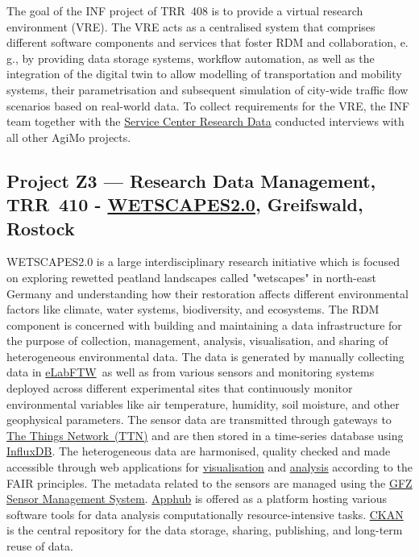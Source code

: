 \documentclass{eceasst}
\newcommand{\eg}{e.\,g.}
\newcommand{\elabftw}{\href{https://www.elabftw.net/}{eLabFTW}}
\begin{document}
The goal of the INF project of TRR~408 is to provide a virtual research environment (VRE).
The VRE acts as a centralised system that comprises different software components and services that foster RDM and collaboration, \eg, by providing data storage systems, workflow automation, as well as the integration of the digital twin to allow modelling of transportation and mobility systems, their parametrisation and subsequent simulation of city-wide traffic flow scenarios based on real-world data. To collect requirements for the VRE, the INF team together with the \href{https://tu-dresden.de/forschung-transfer/services-fuer-forschende/kontaktstelle-forschungsdaten}{Service Center Research Data} conducted interviews with all other AgiMo projects.

\subsection{Project Z3 --- Research Data Management, TRR~410 - \href{https://wetscapes2.uni-greifswald.de/}{WETSCAPES2.0}, Greifswald, Rostock}
WETSCAPES2.0 is a large interdisciplinary research initiative which is focused on exploring rewetted peatland landscapes called "wetscapes" in north-east Germany and understanding how their restoration affects different environmental factors like climate, water systems, biodiversity, and ecosystems.
The RDM component is concerned with building and maintaining a data infrastructure for the purpose of collection, management, analysis, visualisation, and sharing of heterogeneous environmental data.
The data is generated by manually collecting data in \elabftw ~as well as from various sensors and monitoring systems deployed across different experimental sites that continuously monitor environmental variables like air temperature, humidity, soil moisture, and other geophysical parameters.
The sensor data are transmitted through gateways to \href{https://eu1.cloud.thethings.network/}{The Things Network~(TTN)} and are then stored in a time-series database using \href{https://www.influxdata.com/}{InfluxDB}.
The heterogeneous data are harmonised, quality checked and made accessible through web applications for \href{https://retrieval.wetscapes.uni-rostock.de/}{visualisation} and \href{https://explorer.wetscapes.uni-rostock.de/}{analysis} according to the FAIR principles.
The metadata related to the sensors are managed using the \href{https://sensors.gfz.de/}{GFZ Sensor Management System}. \href{https://apphub.wolke.uni-greifswald.de/}{Apphub} is offered as a platform hosting various software tools for data analysis computationally resource-intensive tasks.
\href{https://ckan.fdm.uni-greifswald.de/}{CKAN} is the central repository for the data storage, sharing, publishing, and long-term reuse of data.
\end{document}
